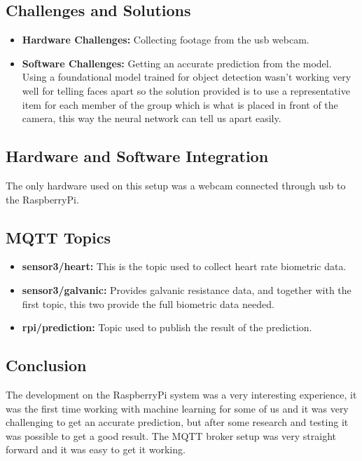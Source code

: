 \documentclass{article}
\begin{document}
\subsection{Challenges and Solutions}
\begin{itemize}
    \item \textbf{Hardware Challenges:} Collecting footage from the usb webcam.
    \item \textbf{Software Challenges:} Getting an accurate prediction from the model. Using a foundational model trained for object detection wasn't working very well for telling faces apart so the solution provided is to use a representative item for each member of the group which is what is placed in front of the camera, this way the neural network can tell us apart easily.
\end{itemize}

\subsection{Hardware and Software Integration}
The only hardware used on this setup was a webcam connected through usb to the RaspberryPi.

\subsection{MQTT Topics}
\begin{itemize}
    \item \textbf{sensor3/heart:} This is the topic used to collect heart rate biometric data.
    \item \textbf{sensor3/galvanic:} Provides galvanic resistance data, and together with the first topic, this two provide the full biometric data needed.
    \item \textbf{rpi/prediction:} Topic used to publish the result of the prediction.
\end{itemize}

\subsection{Conclusion}
The development on the RaspberryPi system was a very interesting experience, it was the first time working with machine learning for some of us and it was very challenging to get an accurate prediction, but after some research and testing it was possible to get a good result. The MQTT broker setup was very straight forward and it was easy to get it working.
\end{document}
